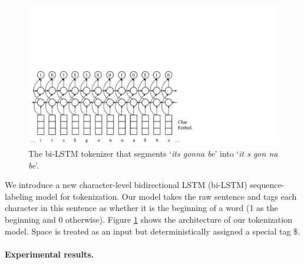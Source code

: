 \documentclass[11pt,a4paper]{article}
\begin{document}
\begin{figure}[t]
	\centering
	\includegraphics[width=\columnwidth,trim={0 0 11cm 9cm},clip]{graphics/bilstm_tokenizer}
	\caption{The bi-LSTM tokenizer that segments `{\it its gonna be}' into `{\it it s gon na be}'.}\label{fig:tok-model}
\end{figure}
We introduce a new
character-level bidirectional LSTM (bi-LSTM) sequence-labeling model
\cite{DBLP:journals/corr/HuangXY15,ma-hovy:2016:P16-1}
for tokenization.
Our model takes the raw sentence and tags each character in this 
sentence as whether it is the beginning of a word (1 as the beginning and 0 otherwise).
Figure \ref{fig:tok-model} shows the architecture of our tokenization model.
Space is treated as an input but deterministically  assigned a special tag \$.

\paragraph{Experimental results.}
\end{document}

